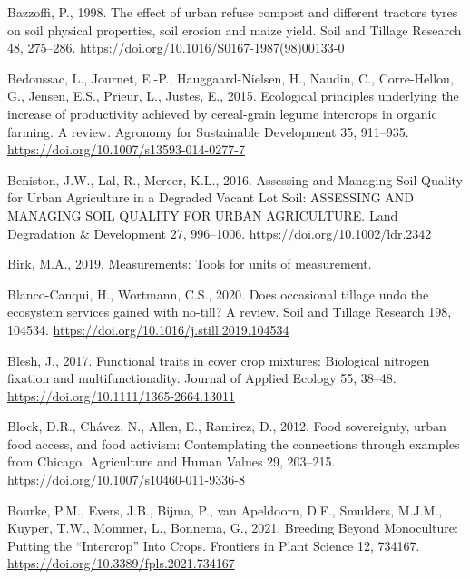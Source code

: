 \documentclass[
  12pt,
]{article}
\newlength{\cslhangindent}
\newlength{\cslentryspacingunit} %
\newenvironment{CSLReferences}[2] %
 {%
  \setlength{\parindent}{0pt}
  \ifodd #1
  \let\oldpar\par
  \def\par{\hangindent=\cslhangindent\oldpar}
  \fi
  \setlength{\parskip}{#2\cslentryspacingunit}
 }%
 {}
\begin{document}
\begin{CSLReferences}{1}{0}
\leavevmode{}%
Bazzoffi, P., 1998. The effect of urban refuse compost and different tractors tyres on soil physical properties, soil erosion and maize yield. Soil and Tillage Research 48, 275--286. \url{https://doi.org/10.1016/S0167-1987(98)00133-0}

\leavevmode{}%
Bedoussac, L., Journet, E.-P., Hauggaard-Nielsen, H., Naudin, C., Corre-Hellou, G., Jensen, E.S., Prieur, L., Justes, E., 2015. Ecological principles underlying the increase of productivity achieved by cereal-grain legume intercrops in organic farming. {A} review. Agronomy for Sustainable Development 35, 911--935. \url{https://doi.org/10.1007/s13593-014-0277-7}

\leavevmode{}%
Beniston, J.W., Lal, R., Mercer, K.L., 2016. Assessing and {Managing Soil Quality} for {Urban Agriculture} in a {Degraded Vacant Lot Soil}: {ASSESSING AND MANAGING SOIL QUALITY FOR URBAN AGRICULTURE}. Land Degradation \& Development 27, 996--1006. \url{https://doi.org/10.1002/ldr.2342}

\leavevmode{}%
Birk, M.A., 2019. \href{https://CRAN.R-project.org/package=measurements}{Measurements: Tools for units of measurement}.

\leavevmode{}%
Blanco-Canqui, H., Wortmann, C.S., 2020. Does occasional tillage undo the ecosystem services gained with no-till? {A} review. Soil and Tillage Research 198, 104534. \url{https://doi.org/10.1016/j.still.2019.104534}

\leavevmode{}%
Blesh, J., 2017. Functional traits in cover crop mixtures: {Biological} nitrogen fixation and multifunctionality. Journal of Applied Ecology 55, 38--48. \url{https://doi.org/10.1111/1365-2664.13011}

\leavevmode{}%
Block, D.R., Chávez, N., Allen, E., Ramirez, D., 2012. Food sovereignty, urban food access, and food activism: Contemplating the connections through examples from {Chicago}. Agriculture and Human Values 29, 203--215. \url{https://doi.org/10.1007/s10460-011-9336-8}

\leavevmode{}%
Bourke, P.M., Evers, J.B., Bijma, P., van Apeldoorn, D.F., Smulders, M.J.M., Kuyper, T.W., Mommer, L., Bonnema, G., 2021. Breeding {Beyond Monoculture}: {Putting} the {``{Intercrop}''} {Into Crops}. Frontiers in Plant Science 12, 734167. \url{https://doi.org/10.3389/fpls.2021.734167}


\end{CSLReferences}
\end{document}
